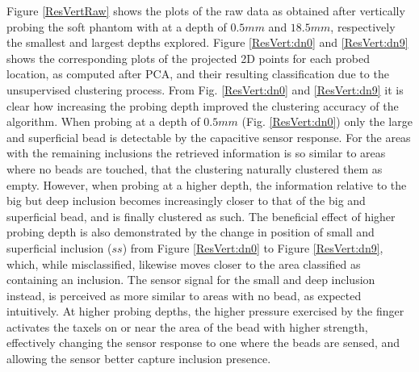 \documentclass[]{interact}
\theoremstyle{plain}%
\theoremstyle{definition}
\theoremstyle{remark}
\begin{document}
Figure \ref{ResVertRaw} shows the plots of the raw data as obtained after vertically probing the soft phantom with at a depth of $0.5mm$ and $18.5mm$, respectively the smallest and largest depths explored. Figure \ref{ResVert:dn0} and \ref{ResVert:dn9} shows the corresponding plots of the projected 2D points for each probed location, as computed after PCA, and their resulting classification due to the unsupervised clustering process. From Fig. \ref{ResVert:dn0} and \ref{ResVert:dn9} it is clear how increasing the probing depth improved the clustering accuracy of the algorithm. When probing at a depth of $0.5mm$ (Fig. \ref{ResVert:dn0}) only the large and superficial bead is detectable by the capacitive sensor response. For the areas with the remaining inclusions the retrieved information is so similar to areas where no beads are touched, that the clustering naturally clustered them as empty. However, when probing at a higher depth, the information relative to the big but deep inclusion becomes increasingly closer to that of the big and superficial bead, and is finally clustered as such. The beneficial effect of higher probing depth is also demonstrated by the change in position of small and superficial inclusion ($ss$) from Figure \ref{ResVert:dn0} to Figure \ref{ResVert:dn9},  which, while misclassified, likewise moves closer to the area classified as containing an inclusion. The sensor signal for the small and deep inclusion instead, is perceived as more similar to areas with no bead, as expected intuitively. At higher probing depths, the higher pressure exercised by the finger activates the taxels on or near the area of the bead with higher strength, effectively changing the sensor response to one where the beads are sensed, and allowing the sensor better capture inclusion presence.
%
\end{document}
